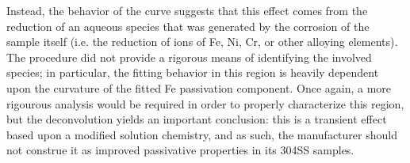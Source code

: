 Instead, the behavior of the curve suggests that this effect comes from the reduction of an aqueous species that was generated by the corrosion of the sample itself (i.e. the reduction of ions of Fe, Ni, Cr, or other alloying elements).  The procedure did not provide a rigorous means of identifying the involved species; in particular, the fitting behavior in this region is heavily dependent upon the curvature of the fitted Fe passivation component.  Once again, a more rigourous analysis would be required in order to properly characterize this region, but the deconvolution yields an important conclusion: this is a transient effect based upon a modified solution chemistry, and as such, the manufacturer should not construe it as improved passivative properties in its 304SS samples.
